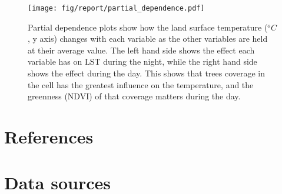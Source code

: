 \documentclass[]{elsarticle}
\begin{document}
\begin{figure}[h]
\begin{center}
\texttt{[image: fig/report/partial\_dependence.pdf]}
\caption{Partial dependence plots show how the land surface temperature ($^oC$, y axis) changes with each variable as the other variables are held at their average value. The left hand side shows the effect each variable has on LST during the night, while the right hand side shows the effect during the day. This shows that trees coverage in the cell has the greatest influence on the temperature, and the greenness (NDVI) of that coverage matters during the day.}
\label{fig:pdp}
\end{center}
\end{figure}






\section*{References}



\appendix
\section{Data sources}
\end{document}
